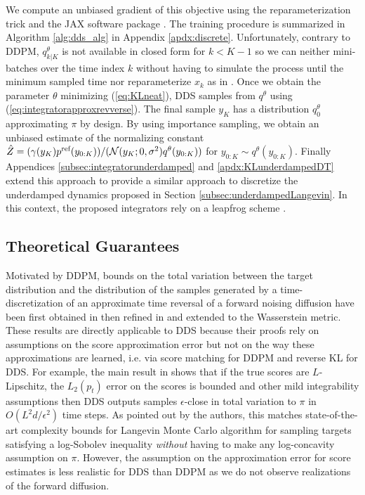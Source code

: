 \documentclass{article} %
\begin{document}
We compute an unbiased gradient of this objective using the reparameterization trick and the JAX software package \citep{jax2018github}. The training procedure is summarized in Algorithm \ref{alg:dds_alg} in Appendix \ref{apdx:discrete}. Unfortunately, contrary to DDPM, $q^{\theta}_{k|K}$ is not available in closed form for $k<K-1$ so we can neither mini-batches over the time index $k$ without having to simulate the process until the minimum sampled time nor reparameterize $x_k$ as in \cite{ho2020denoising}. 
Once we obtain the parameter $\theta$ minimizing (\ref{eq:KLneat}), DDS samples from $q^{\theta}$ using (\ref{eq:integratorapproxrevverse}). The final sample $y_K$ has a distribution $q^{\theta}_0$ approximating $\pi$ by design. By using importance sampling, we obtain an unbiased estimate of the normalizing constant $\hat{Z}=(\gamma(y_{K})p^{\textup{ref}}(y_{0:K}))/(\mathcal{N}(y_K;0,\sigma^2) q^\theta(y_{0:K}))$ for $y_{0:K}\sim q^\theta(y_{0:K})$. Finally Appendices \ref{subsec:integratorunderdamped} and \ref{apdx:KLunderdampedDT} extend this approach to provide a similar approach to discretize the underdamped dynamics proposed in Section \ref{subsec:underdampedLangevin}. In this context, the proposed integrators rely on a leapfrog scheme \citep{leimkuhler2016molecular}.

\subsection{Theoretical Guarantees}
Motivated by DDPM, bounds on the total variation between the target distribution and the distribution of the samples generated by a time-discretization of an approximate time reversal of a forward noising diffusion have been first obtained in \citep{debortoli2021diffusion} then refined in \citep{debortoli2022convergence,ChenChewiSinhosamplingaseasyaslearningscore2022,lee2022convergencenocondition} and extended to the Wasserstein metric. These results are directly applicable to DDS because their proofs rely on assumptions on the score approximation error but not on the way these approximations are learned, i.e. via score matching for DDPM and reverse KL for DDS. For example, the main result in \cite{ChenChewiSinhosamplingaseasyaslearningscore2022} shows that if the true scores are $L$-Lipschitz, the $L_2(p_t)$ error on the scores is bounded and other mild integrability assumptions then DDS outputs samples $\epsilon$-close in total variation to $\pi$ in $O(L^2d/\epsilon^2)$ time steps. As pointed out by the authors, this matches state-of-the-art complexity bounds for Langevin Monte Carlo algorithm for sampling targets satisfying a log-Sobolev inequality \emph{without} having to make any log-concavity assumption on $\pi$.
However, the assumption on the approximation error for score estimates is less realistic for DDS than DDPM as we do not observe realizations of the forward diffusion.
\end{document}
